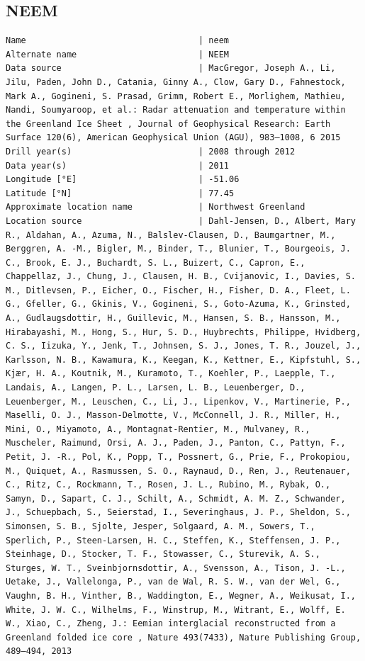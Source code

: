 \documentclass[article,a4paper,times,11pt,twoside]{article}
\begin{document}
\subsection{NEEM}
\label{sec:org1f76406}
\begin{verbatim}
Name                                  | neem
Alternate name                        | NEEM
Data source                           | MacGregor, Joseph A., Li, Jilu, Paden, John D., Catania, Ginny A., Clow, Gary D., Fahnestock, Mark A., Gogineni, S. Prasad, Grimm, Robert E., Morlighem, Mathieu, Nandi, Soumyaroop, et al.: Radar attenuation and temperature within the Greenland Ice Sheet , Journal of Geophysical Research: Earth Surface 120(6), American Geophysical Union (AGU), 983–1008, 6 2015 
Drill year(s)                         | 2008 through 2012
Data year(s)                          | 2011
Longitude [°E]                        | -51.06
Latitude [°N]                         | 77.45
Approximate location name             | Northwest Greenland
Location source                       | Dahl-Jensen, D., Albert, Mary R., Aldahan, A., Azuma, N., Balslev-Clausen, D., Baumgartner, M., Berggren, A. -M., Bigler, M., Binder, T., Blunier, T., Bourgeois, J. C., Brook, E. J., Buchardt, S. L., Buizert, C., Capron, E., Chappellaz, J., Chung, J., Clausen, H. B., Cvijanovic, I., Davies, S. M., Ditlevsen, P., Eicher, O., Fischer, H., Fisher, D. A., Fleet, L. G., Gfeller, G., Gkinis, V., Gogineni, S., Goto-Azuma, K., Grinsted, A., Gudlaugsdottir, H., Guillevic, M., Hansen, S. B., Hansson, M., Hirabayashi, M., Hong, S., Hur, S. D., Huybrechts, Philippe, Hvidberg, C. S., Iizuka, Y., Jenk, T., Johnsen, S. J., Jones, T. R., Jouzel, J., Karlsson, N. B., Kawamura, K., Keegan, K., Kettner, E., Kipfstuhl, S., Kjær, H. A., Koutnik, M., Kuramoto, T., Koehler, P., Laepple, T., Landais, A., Langen, P. L., Larsen, L. B., Leuenberger, D., Leuenberger, M., Leuschen, C., Li, J., Lipenkov, V., Martinerie, P., Maselli, O. J., Masson-Delmotte, V., McConnell, J. R., Miller, H., Mini, O., Miyamoto, A., Montagnat-Rentier, M., Mulvaney, R., Muscheler, Raimund, Orsi, A. J., Paden, J., Panton, C., Pattyn, F., Petit, J. -R., Pol, K., Popp, T., Possnert, G., Prie, F., Prokopiou, M., Quiquet, A., Rasmussen, S. O., Raynaud, D., Ren, J., Reutenauer, C., Ritz, C., Rockmann, T., Rosen, J. L., Rubino, M., Rybak, O., Samyn, D., Sapart, C. J., Schilt, A., Schmidt, A. M. Z., Schwander, J., Schuepbach, S., Seierstad, I., Severinghaus, J. P., Sheldon, S., Simonsen, S. B., Sjolte, Jesper, Solgaard, A. M., Sowers, T., Sperlich, P., Steen-Larsen, H. C., Steffen, K., Steffensen, J. P., Steinhage, D., Stocker, T. F., Stowasser, C., Sturevik, A. S., Sturges, W. T., Sveinbjornsdottir, A., Svensson, A., Tison, J. -L., Uetake, J., Vallelonga, P., van de Wal, R. S. W., van der Wel, G., Vaughn, B. H., Vinther, B., Waddington, E., Wegner, A., Weikusat, I., White, J. W. C., Wilhelms, F., Winstrup, M., Witrant, E., Wolff, E. W., Xiao, C., Zheng, J.: Eemian interglacial reconstructed from a Greenland folded ice core , Nature 493(7433), Nature Publishing Group, 489–494, 2013 

\end{verbatim}
\end{document}
